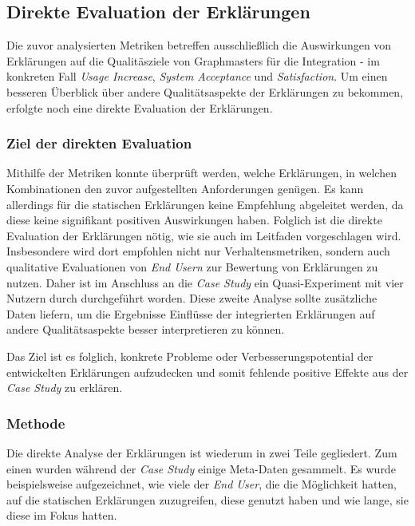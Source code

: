 \subsection{Direkte Evaluation der Erklärungen}
\label{sec:study_results_qualitativ}

Die zuvor analysierten Metriken betreffen ausschließlich die Auswirkungen von Erklärungen auf die Qualitäsziele von Graphmasters für die Integration - im konkreten Fall \textit{Usage Increase}, \textit{System Acceptance} und \textit{Satisfaction}. Um einen besseren Überblick über andere Qualitätsaspekte der Erklärungen zu bekommen, erfolgte noch eine direkte Evaluation der Erklärungen.

\subsubsection{Ziel der direkten Evaluation}

Mithilfe der Metriken konnte überprüft werden, welche Erklärungen, in welchen Kombinationen den zuvor aufgestellten Anforderungen genügen. Es kann allerdings für die statischen Erklärungen keine Empfehlung abgeleitet werden, da diese keine signifikant positiven Auswirkungen haben.
Folglich ist die direkte Evaluation der Erklärungen nötig, wie sie auch im Leitfaden vorgeschlagen wird. Insbesondere wird dort empfohlen nicht nur Verhaltensmetriken, sondern auch qualitative Evaluationen von \textit{End Usern} zur Bewertung von Erklärungen zu nutzen. Daher ist im Anschluss an die \textit{Case Study} ein Quasi-Experiment mit vier Nutzern durch durchgeführt worden. Diese zweite Analyse sollte zusätzliche Daten liefern, um die Ergebnisse Einflüsse der integrierten Erklärungen auf andere Qualitätsaspekte besser interpretieren zu können.

Das Ziel ist es folglich, konkrete Probleme oder Verbesserungspotential der entwickelten Erklärungen aufzudecken und somit fehlende positive Effekte aus der \textit{Case Study} zu erklären.

\subsubsection{Methode}

Die direkte Analyse der Erklärungen ist wiederum in zwei Teile gegliedert. Zum einen wurden während der \textit{Case Study} einige Meta-Daten gesammelt. Es wurde beispielsweise aufgezeichnet, wie viele der \textit{End User}, die die Möglichkeit hatten, auf die statischen Erklärungen zuzugreifen, diese genutzt haben und wie lange, sie diese im Fokus hatten.

